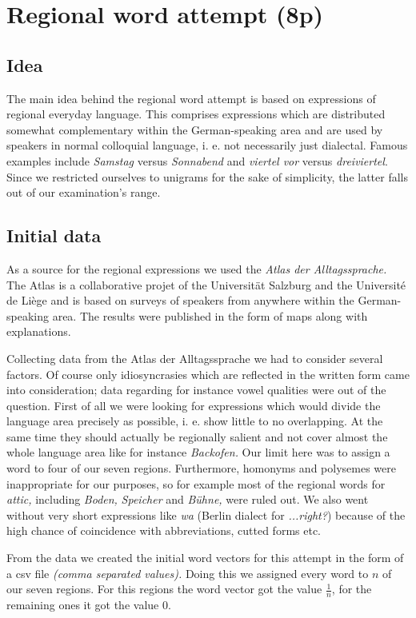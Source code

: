 \documentclass[../Main.tex]{subfiles}
\begin{document}
\section{Regional word attempt (8p)}
\subsection{Idea}
The main idea behind the regional word attempt is based on expressions of regional everyday language. This comprises expressions which are distributed somewhat complementary within the German-speaking area and are used by speakers in normal colloquial language, i. e. not necessarily just dialectal. Famous examples include \textit{Samstag} versus \textit{Sonnabend} and \textit{viertel vor} versus \textit{dreiviertel}. Since we restricted ourselves to unigrams for the sake of simplicity, the latter falls out of our examination's range.

\subsection{Initial data}
As a source for the regional expressions we used the \textit{Atlas der Alltagssprache.} The Atlas is a collaborative projet of the Universität Salzburg and the Université de Liège and is based on surveys of speakers from anywhere within the German-speaking area. The results were published in the form of maps along with explanations.

Collecting data from the Atlas der Alltagssprache we had to consider several factors. Of course only idiosyncrasies which are reflected in the written form came into consideration; data regarding for instance vowel qualities were out of the question. First of all we were looking for expressions which would divide the language area precisely as possible, i. e. show little to no overlapping. At the same time they should actually be regionally salient and not cover almost the whole language area like for instance \textit{Backofen.} Our limit here was to assign a word to four of our seven regions. Furthermore, homonyms and polysemes were inappropriate for our purposes, so for example most of the regional words for \textit{attic,} including \textit{Boden,} \textit{Speicher} and \textit{Bühne,} were ruled out. We also went without very short expressions like \textit{wa} (Berlin dialect for \textit{...right?}) because of the high chance of coincidence with abbreviations, cutted forms etc.

From the data we created the initial word vectors for this attempt in the form of a csv file \textit{(comma separated values).} Doing this we assigned every word to $n$ of our seven regions. For this regions the word vector got the value $\frac 1 n$, for the remaining ones it got the value 0.
\end{document}
